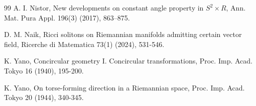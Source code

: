 \documentclass[12pt,reqno]{amsart}
\theoremstyle{definition}
\begin{document}
\begin{thebibliography}{99}
 A. I. Nistor, New developments on constant angle property in $S^2\times R$, Ann. Mat. Pura Appl. 196(3) (2017), 863–875.

 D. M. Naik, Ricci solitons on Riemannian manifolds admitting certain vector field, Ricerche di Matematica 73(1) (2024), 531-546.


 K. Yano, Concircular geometry I. Concircular transformations, Proc. Imp. Acad. Tokyo 16 (1940), 195-200.

 K. Yano, On torse-forming direction in a Riemannian space, Proc. Imp. Acad. Tokyo 20 (1944), 340-345.


\end{thebibliography}




 
\end{document}
